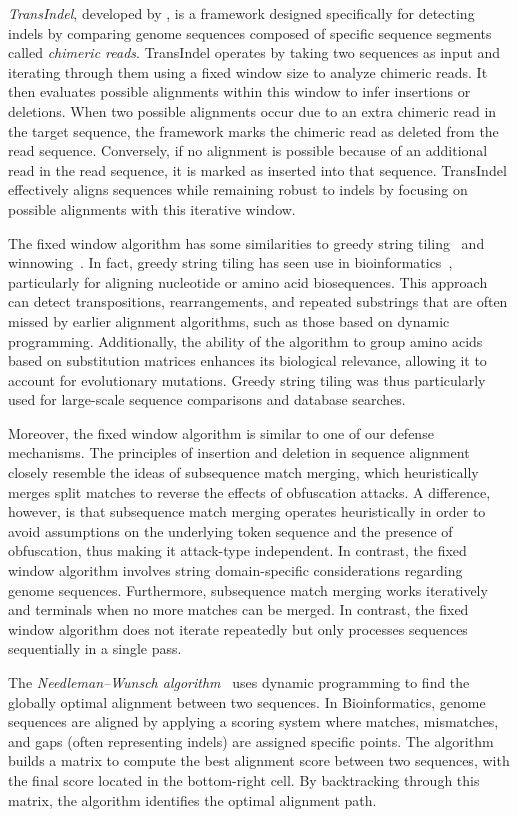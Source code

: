 \textit{TransIndel}, developed by \citet{Yang2018}, is a framework designed specifically for detecting indels by comparing genome sequences composed of specific sequence segments called \textit{chimeric reads}. TransIndel operates by taking two sequences as input and iterating through them using a fixed window size to analyze chimeric reads. 
It then evaluates possible alignments within this window to infer insertions or deletions. When two possible alignments occur due to an extra chimeric read in the target sequence, the framework marks the chimeric read as deleted from the read sequence. Conversely, if no alignment is possible because of an additional read in the read sequence, it is marked as inserted into that sequence. TransIndel effectively aligns sequences while remaining robust to indels by focusing on possible alignments with this iterative window.

The fixed window algorithm has some similarities to greedy string tiling~\cite{Wise1993} and winnowing~\cite {Schleimer2003}. In fact, greedy string tiling has seen use in bioinformatics~\cite{Wise1995}, particularly for aligning nucleotide or amino acid biosequences. This approach can detect transpositions, rearrangements, and repeated substrings that are often missed by earlier alignment algorithms, such as those based on dynamic programming.
Additionally, the ability of the algorithm to group amino acids based on substitution matrices enhances its biological relevance, allowing it to account for evolutionary mutations. Greedy string tiling was thus particularly used for large-scale sequence comparisons and database searches.

Moreover, the fixed window algorithm is similar to one of our defense mechanisms.
The principles of insertion and deletion in sequence alignment closely resemble the ideas of subsequence match merging, which heuristically merges split matches to reverse the effects of obfuscation attacks. A difference, however, is that subsequence match merging operates heuristically in order to avoid assumptions on the underlying token sequence and the presence of obfuscation, thus making it attack-type independent. In contrast, the fixed window algorithm involves string domain-specific considerations regarding genome sequences. Furthermore, subsequence match merging works iteratively and terminals when no more matches can be merged. In contrast, the fixed window algorithm does not iterate repeatedly but only processes sequences sequentially in a single pass.

The \textit{Needleman–Wunsch algorithm}~\cite{Needleman1970} uses dynamic programming to find the globally optimal alignment between two sequences. In Bioinformatics, genome sequences are aligned by applying a scoring system where matches, mismatches, and gaps (often representing indels) are assigned specific points. The algorithm builds a matrix to compute the best alignment score between two sequences, with the final score located in the bottom-right cell. By backtracking through this matrix, the algorithm identifies the optimal alignment path.


